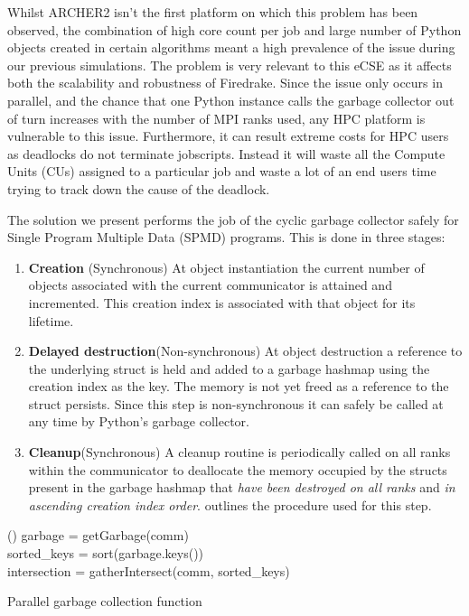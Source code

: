 \documentclass[a4paper,11pt]{article}
\begin{document}
Whilst ARCHER2 isn't the first platform on which this problem has been observed, the combination of high core count per job and large number of Python objects created in certain algorithms meant a high prevalence of the issue during our previous simulations.
The problem is very relevant to this eCSE as it affects both the scalability and robustness of Firedrake.
Since the issue only occurs in parallel, and the chance that one Python instance calls the garbage collector out of turn increases with the number of MPI ranks used, any HPC platform is vulnerable to this issue.
Furthermore, it can result extreme costs for HPC users as deadlocks do not terminate jobscripts.
Instead it will waste all the Compute Units (CUs) assigned to a particular job and waste a lot of an end users time trying to track down the cause of the deadlock.

The solution we present performs the job of the cyclic garbage collector safely for Single Program Multiple Data (SPMD) programs.
This is done in three stages:
\begin{enumerate}
	\item \label{item:create}\textbf{Creation} (Synchronous)
	At object instantiation the current number of objects associated with the current communicator is attained and incremented.
	This creation index is associated with that object for its lifetime.
	\item \label{item:destroy}\textbf{Delayed destruction}(Non-synchronous)
	At object destruction a reference to the underlying struct is held and added to a garbage hashmap using the creation index as the key.
	The memory is not yet freed as a reference to the struct persists.
	Since this step is non-synchronous it can safely be called at any time by Python's garbage collector.
	\item \label{item:cleanup}\textbf{Cleanup}(Synchronous)
	A cleanup routine is periodically called on all ranks within the communicator to deallocate the memory occupied by the structs present in the garbage hashmap that \emph{have been destroyed on all ranks} and \emph{in ascending creation index order}.
     outlines the procedure used for this step.
\end{enumerate}

\begin{algorithm}[htp]
	\Function(){
		garbage = getGarbage(comm)\\
		sorted\_keys = sort(garbage.keys())\\
		intersection = gatherIntersect(comm, sorted\_keys)\\
	}
	\caption[]{Parallel garbage collection function}
	\label{alg:cleanup}
\end{algorithm}
\end{document}

